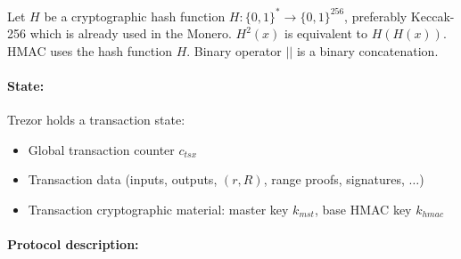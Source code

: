 \documentclass[]{article}
\begin{document}
Let $H$ be a cryptographic hash function $H : \{0,1\}^* \rightarrow \{0,1\}^{256}$, preferably Keccak-256 which is already used in the Monero. $H^2(x)$ is equivalent to $H(H(x))$.  HMAC uses the hash function $H$. Binary operator $||$ is a binary concatenation.

\paragraph{State:}
Trezor holds a transaction state:
\begin{itemize}
	\item Global transaction counter $c_{tsx}$
	\item Transaction data (inputs, outputs, $(r,R)$, range proofs, signatures, $\dots$)
	\item Transaction cryptographic material: master key $k_{mst}$, base HMAC key $k_{hmac}$
\end{itemize}

\paragraph{Protocol description:}
\end{document}
